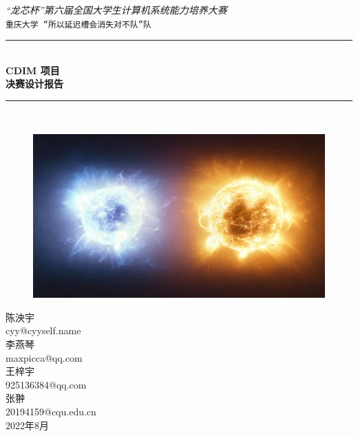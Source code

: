 \documentclass[black,normal,cn,hide]{elegantbook}
\newcommand{\artdate}{2022年8月}
\newcommand{\hlrule}{\rule{\linewidth}{0.5mm}}
\begin{document}
\begin{titlepage}
    \vfill
    \center 
    \textit{\Large “龙芯杯”第六届全国大学生计算机系统能力培养大赛}\\[0.5cm] 
    \texttt{\Large 重庆大学 “所以延迟槽会消失对不队”队}
  
    \vspace{1.5 cm}
    \hlrule \\[0.4 cm]
    { \huge \bfseries CDIM 项目}\\[0.4cm]
    { \huge \bfseries 决赛设计报告}\\
    \hlrule \\[1cm]
   
    \begin{figure}[h]
      \centering
      \includegraphics[width=0.5\linewidth]{img/logo.png}
    \end{figure}
   \vspace{0.5 cm}
  
    \vspace{.5 cm}
    陈泱宇\\
    cyy@cyyself.name\\
    \vspace{.5 cm}
    李燕琴\\
    maxpicca@qq.com\\
    \vspace{.5 cm}
    王梓宇\\
    925136384@qq.com\\
    \vspace{.5 cm}
    张翀\\
    20194159@cqu.edu.cn\\
  
    \vspace{2 cm}
    {\large \artdate}\\[3cm] 
  
  \vfill
  
\end{titlepage}

\tableofcontents
\mainmatter



\end{document}

